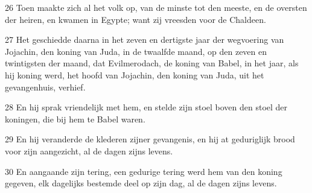 \par 26 Toen maakte zich al het volk op, van de minste tot den meeste, en de oversten der heiren, en kwamen in Egypte; want zij vreesden voor de Chaldeen.
\par 27 Het geschiedde daarna in het zeven en dertigste jaar der wegvoering van Jojachin, den koning van Juda, in de twaalfde maand, op den zeven en twintigsten der maand, dat Evilmerodach, de koning van Babel, in het jaar, als hij koning werd, het hoofd van Jojachin, den koning van Juda, uit het gevangenhuis, verhief.
\par 28 En hij sprak vriendelijk met hem, en stelde zijn stoel boven den stoel der koningen, die bij hem te Babel waren.
\par 29 En hij veranderde de klederen zijner gevangenis, en hij at geduriglijk brood voor zijn aangezicht, al de dagen zijns levens.
\par 30 En aangaande zijn tering, een gedurige tering werd hem van den koning gegeven, elk dagelijks bestemde deel op zijn dag, al de dagen zijns levens.




